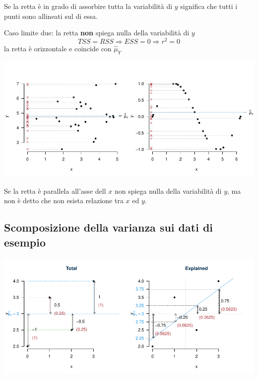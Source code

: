 \documentclass[
  11pt,
]{book}
\theoremstyle{mytheoremstyle}
\theoremstyle{mydefstyle}
\begin{document}
Se la retta è in grado di assorbire tutta la variabilità di \(y\) significa che tutti
i punti sono allineati sul di essa.

Caso limite due: la retta \textbf{non} spiega nulla della variabilità di \(y\)
\[TSS = RSS\Rightarrow ESS=0\Rightarrow r^2=0\]
la retta è orizzontale e coincide con \(\hat\mu_Y\)

\begin{center}\includegraphics{Appunti_di_Statistica_2025_files/figure-latex/17-regressione-I-57-1} \end{center}

Se la retta è parallela all'asse dell \(x\) non spiega nulla della variabilità di \(y\), ma non è detto che non esista relazione tra \(x\) ed \(y\).

\subsection{Scomposizione della varianza sui dati di esempio}\label{scomposizione-della-varianza-sui-dati-di-esempio}

\begin{center}\includegraphics{Appunti_di_Statistica_2025_files/figure-latex/17-regressione-I-58-1} \end{center}
\end{document}
